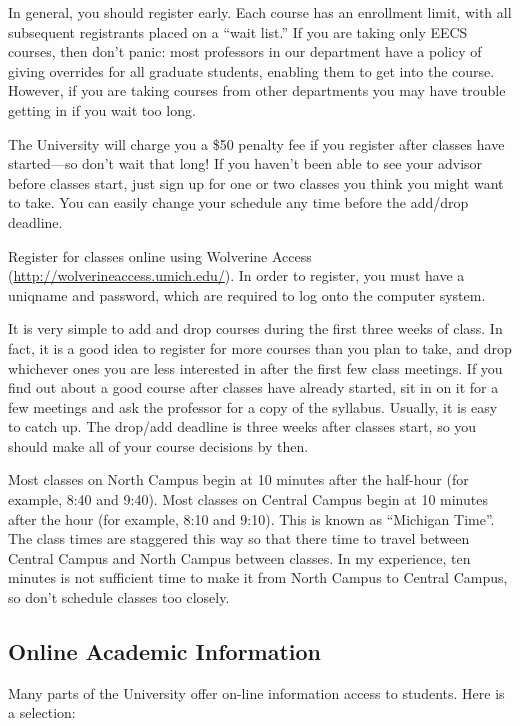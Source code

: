 \documentclass[11pt]{article}
\begin{document}
In general, you should register early.  Each course has an enrollment
limit, with all subsequent registrants placed on a “wait list.”  If
you are taking only EECS courses, then don't panic:  most professors
in our department have a policy of giving overrides for all graduate
students, enabling them to get into the course.  However, if you are
taking courses from other departments you may have trouble getting in
if you wait too long.

The University will charge you a \$50 penalty fee if you register after
classes have started—so don't wait that long!  If you haven't been
able to see your advisor before classes start, just sign up for one or
two classes you think you might want to take.  You can easily change
your schedule any time before the add/drop deadline.

Register for classes online using Wolverine Access
(\href{http://wolverineaccess.umich.edu/}{http://wolverineaccess.umich.edu/}).  In order to register, you must
have a uniqname and password, which are required to log onto the
computer system.

It is very simple to add and drop courses during the first three weeks
of class.  In fact, it is a good idea to register for more courses
than you plan to take, and drop whichever ones you are less interested
in after the first few class meetings.  If you find out about a good
course after classes have already started, sit in on it for a few
meetings and ask the professor for a copy of the syllabus.  Usually,
it is easy to catch up.  The drop/add deadline is three weeks after
classes start, so you should make all of your course decisions by
then.

Most classes on North Campus begin at 10 minutes after the half-hour
(for example, 8:40 and 9:40).  Most classes on Central Campus begin at
10 minutes after the hour (for example, 8:10 and 9:10).  This is known
as “Michigan Time”.  The class times are staggered this way so that
there time to travel between Central Campus and North Campus between
classes.  In my experience, ten minutes is not sufficient time to make
it from North Campus to Central Campus, so don’t schedule classes too
closely.
\subsection{Online Academic Information}
\label{sec-5_6}

Many parts of the University offer on-line information access to
students. Here is a selection:
\end{document}
